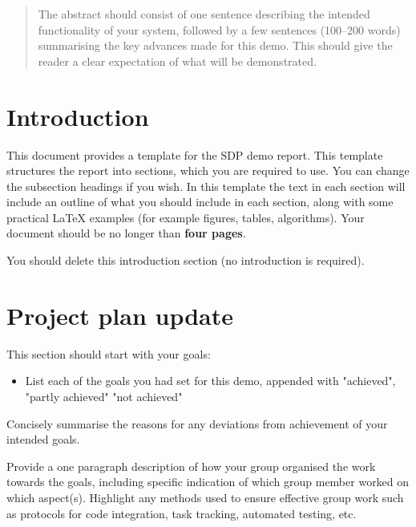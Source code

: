 \documentclass{article}
\begin{document}
 



\begin{abstract} 
The abstract should consist of one sentence describing the intended functionality of your system, followed by a few sentences (100--200 words) summarising the key advances made for this demo. This should give the reader a clear expectation of what will be demonstrated.
\end{abstract} 

\section*{Introduction}
\label{sec:intro}
This document provides a template for the SDP demo report.  This template structures the report into sections, which you are required to use. You can change the subsection headings if you wish. In this template the text in each section will include an outline of what you should include in each section, along with some practical LaTeX examples (for example figures, tables, algorithms).  Your document should be no longer than \textbf{four pages}. 

You should delete this introduction section (no introduction is required).

\section{Project plan update} 

This section should start with your goals:
\begin{itemize}
    \item List each of the goals you had set for this demo, appended with "achieved", "partly achieved" "not achieved"
\end{itemize}

Concisely summarise the reasons for any deviations from achievement of your intended goals.

Provide a one paragraph description of how your group organised the work towards the goals, including specific indication of which group member worked on which aspect(s). Highlight any methods used to ensure effective group work such as protocols for code integration, task tracking, automated testing, etc.
\end{document}
